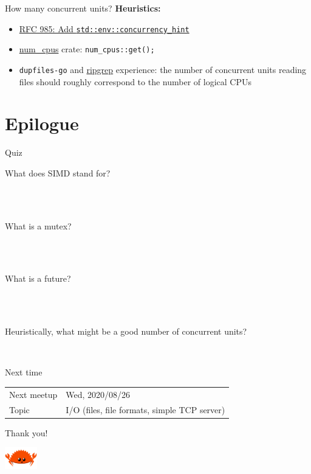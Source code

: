 \documentclass{beamer}
\begin{document}
\begin{frame}[fragile]{How many concurrent units?}
  \textbf{Heuristics:}
  \begin{itemize}
    \item \href{https://github.com/rust-lang/rfcs/pull/985}{RFC 985: Add \texttt{std::env::concurrency_hint}}
    \item \href{https://crates.io/crates/num_cpus}{num\_cpus} crate: \texttt{num_cpus::get();}
    \item \texttt{dupfiles-go} and \href{https://github.com/BurntSushi/ripgrep/}{ripgrep} experience: the number of concurrent units reading files should roughly correspond to the number of logical CPUs
  \end{itemize}
\end{frame}

\section{Epilogue}


\begin{frame}[fragile]{Quiz}
  \begin{description}
    \item[What does SIMD stand for?] \hfill{} \\
      ~
    \item[What is a mutex?] \hfill{} \\
      ~
    \item[What is a future?] \hfill{} \\
      ~
    \item[Heuristically, what might be a good number of concurrent units?]
      ~
  \end{description}
\end{frame}


\begin{frame}[fragile]{Next time}
  \begin{tabular}{ll}
    Next meetup  & Wed, 2020/08/26 \\
    Topic        & I/O (files, file formats, simple TCP server)
  \end{tabular}
\end{frame}

\begin{frame}[standout]
  Thank you!

  \includegraphics[width=40pt]{images/rustacean-flat-happy.png}
\end{frame}
\end{document}
